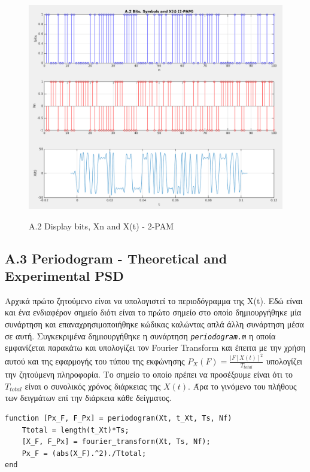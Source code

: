 \documentclass[11pt]{article}
\begin{document}
    \begin{figure}[H]
        \centering
        \includegraphics[scale=0.5, width=\textwidth]{figures/A2-b_Xn_Xt.png} \\
        \caption{A.2 Display bits, Xn and X(t) - 2-PAM}
    \end{figure}
    
    
    \subsection*{A.3 Periodogram - Theoretical and Experimental PSD}
    Αρχικά πρώτο ζητούμενο είναι να υπολογιστεί το περιοδόγραμμα της X(t). 
    Εδώ είναι και ένα ενδιαφέρον σημείο διότι είναι το πρώτο σημείο στο οποίο δημιουργήθηκε μία συνάρτηση και επαναχρησιμοποιήθηκε κώδικας καλώντας απλά άλλη συνάρτηση μέσα σε αυτή. 
    Συγκεκριμένα δημιουργήθηκε η συνάρτηση \emph{\texttt{periodogram.m}} η οποία εμφανίζεται παρακάτω και υπολογίζει τον Fourier Transform και έπειτα με την χρήση αυτού και της εφαρμογής του τύπου της εκφώνησης $P_X(F) = \frac{|F[X(t)]^2}{T_{total}}$ υπολογίζει την ζητούμενη πληροφορία. 
    Το σημείο το οποίο πρέπει να προσέξουμε είναι ότι το $T_{total}$  είναι ο συνολικός χρόνος διάρκειας της $X(t)$. 
    Άρα το γινόμενο του πλήθους των δειγμάτων επί την διάρκεια κάθε δείγματος.
    
    \begin{lstlisting}[caption = {periodogram.m}]
function [Px_F, F_Px] = periodogram(Xt, t_Xt, Ts, Nf)
    Ttotal = length(t_Xt)*Ts;
    [X_F, F_Px] = fourier_transform(Xt, Ts, Nf);
    Px_F = (abs(X_F).^2)./Ttotal;
end
    \end{lstlisting}
\end{document}
